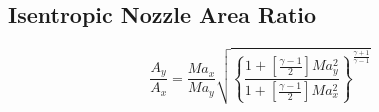 \documentclass{article}
\begin{document}
\subsection{Isentropic Nozzle Area Ratio}
\begin{equation} \tag{1.7} \label{1.7}
    \frac{A_y}{A_x} = \frac{Ma_x}{Ma_y} \sqrt{\left\{\frac{1 + \left[\frac{\gamma - 1}{2}\right] Ma_y ^ 2}{1 + \left[\frac{\gamma - 1}{2}\right] Ma_x ^ 2}\right\} ^ {\frac{\gamma + 1}{\gamma - 1}}}
\end{equation}


\pagebreak



\end{document}
